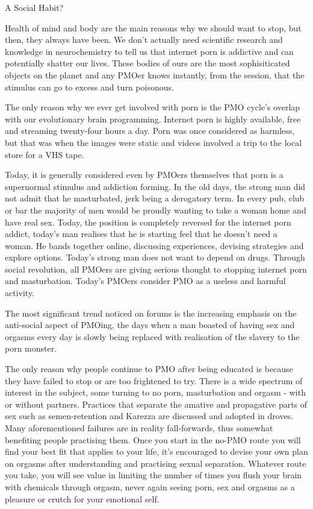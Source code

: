 A Social Habit?

Health of mind and body are the main reasons why we should want to stop, but then, they always have been. We don't actually need scientific research and knowledge in neurochemistry to tell us that internet porn is addictive and can potentially shatter our lives. These bodies of ours are the most sophisiticated objects on the planet and any PMOer knows instantly, from the session, that the stimulus can go to excess and turn poisonous.

The only reason why we ever get involved with porn is the PMO cycle's overlap with our evolutionary brain programming. Internet porn is highly available, free and streaming twenty-four hours a day. Porn was once considered as harmless, but that was when the images were static and videos involved a trip to the local store for a VHS tape.

Today, it is generally considered even by PMOers themselves that porn is a supernormal stimulus and addiction forming. In the old days, the strong man did not admit that he masturbated, jerk being a derogatory term. In every pub, club or bar the majority of men would be proudly wanting to take a woman home and have real sex. Today, the position is completely reversed for the internet porn addict, today's man realises that he is starting feel that he doesn't need a woman. He bands together online, discussing experiences, devising strategies and explore options. Today's strong man does not want to depend on drugs. Through social revolution, all PMOers are giving serious thought to stopping internet porn and masturbation. Today's PMOers consider PMO as a useless and harmful activity.

The most significant trend noticed on forums is the increasing emphasis on the anti-social aspect of PMOing, the days when a man boasted of having sex and orgasms every day is slowly being replaced with realisation of the slavery to the porn monster.

The only reason why people continue to PMO after being educated is because they have failed to stop or are too frightened to try. There is a wide spectrum of interest in the subject, some turning to no porn, masturbation and orgasm - with or without partners. Practices that separate the amative and propagative parts of sex such as semen-retention and Karezza are discussed and adopted in droves. Many aforementioned failures are in reality fall-forwards, thus somewhat benefiting people practising them. Once you start in the no-PMO route you will find your best fit that applies to your life, it's encouraged to devise your own plan on orgasms after understanding and practising sexual separation. Whatever route you take, you will see value in limiting the number of times you flush your brain with chemicals through orgasm, never again seeing porn, sex and orgasms as a pleasure or crutch for your emotional self.

